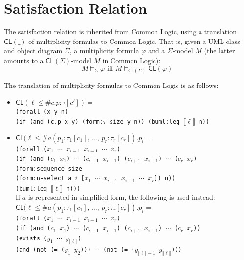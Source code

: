 \documentclass[10pt,fleqn,final]{scrreprt}
\newcommand{\cbs}[0]{\color{red}\xspace} %
\newcommand{\cbe}[0]{\color{black}\xspace} %
\newcommand*{\CL}{\ensuremath{\mathsf{CL}}\xspace}
\newenvironment{definitions}[0]{\medskip }{}
\newcommand{\sem}[1]{\mathopen\llbracket#1\mathclose\rrbracket}
\newcommand{\white}[1]{{\color{white}{#1}}}
\newcommand{\qqquad}{\white{x}\qquad}
\begin{document}
\begin{definitions}
\section{Satisfaction Relation}\label{a:UML-CD-sat}
The satisfaction relation is inherited from Common Logic, using
a translation $\CL(\_)$ of multiplicity formulas to Common Logic.
That is, given a UML class and object diagram $\Sigma$, a
multiplicity formula $\varphi$ and a $\Sigma$-model $M$ (the
latter amounts to a $\CL(\Sigma)$-model $M$ in Common Logic): 
$$M\models_\Sigma\varphi\text{ iff }M\models_{\CL(\Sigma)}\CL(\varphi)$$

The translation of multiplicity formulas to Common Logic is as follows:
\begin{itemize}
  \item  $\CL(\ell \leq \mathsf{\#}c\mathsf{.}p \mathrel{\mathsf{:}} \tau[c']) =$\\
\texttt{(forall (x y n)}\\
\qqquad\texttt{(if (and (c.p x y) (form:$\tau$-size y n)) (buml:leq $\sem{\ell}$ n))}
  \item $\CL(\ell \leq \mathsf{\#}a(p_1 \mathrel{\mathsf{:}} \tau_1[c_1]\mathsf{,}\, \dots\mathsf{,}\, p_r \mathrel{\mathsf{:}} \tau_r[c_r])\mathsf{.}p_i=$\\
\texttt{(forall ($x_1$ $\cdots$ $x_{i-1}$ $x_{i+1}$ $\cdots$ $x_r$)}\\
\qqquad\texttt{(if (and ($c_1$ $x_1$) $\cdots$ ($c_{i-1}$ $x_{i-1}$) ($c_{i+1}$ $x_{i+1}$) $\cdots$ ($c_r$ $x_r$)\\
\qqquad\qqquad\qqquad  (form:sequence-size \\
\qqquad\qqquad\qqquad\qqquad(form:n-select a $i$ [$x_1$ $\cdots$ $x_{i-1}$ $x_{i+1}$ $\cdots$ $x_r$]) n))\\
\qqquad\qqquad (buml:leq $\sem{\ell}$ n)))}\\
If $a$ is represented in simplified form,\cbs the following is used instead:\cbe\\
$\CL(\ell \leq \mathsf{\#}a(p_1 \mathrel{\mathsf{:}} \tau_1[c_1]\mathsf{,}\, \dots\mathsf{,}\, p_r \mathrel{\mathsf{:}} \tau_r[c_r])\mathsf{.}p_i=$\\
\texttt{(forall ($x_1$ $\cdots$ $x_{i-1}$ $x_{i+1}$ $\cdots$ $x_r$)\\
\qqquad(if (and ($c_1$ $x_1$) $\cdots$ ($c_{i-1}$ $x_{i-1}$) ($c_{i+1}$ $x_{i+1}$) $\cdots$ ($c_r$ $x_r$))\\
\qqquad\qqquad\qquad  (exists ($y_1$ $\cdots$ $y_{\sem{\ell}}$)\\
\qqquad\qqquad\qquad\qquad (and (not (= ($y_1$ $y_2$))) $\cdots$  (not (= ($y_{\sem{\ell}-1}$ $y_{\sem{\ell}}$))) \\
}
\end{itemize}
\end{definitions}
\end{document}
